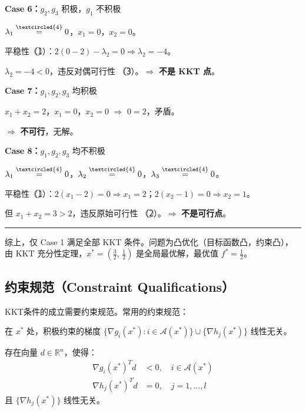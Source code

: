 \begin{example}[KKT条件求解]
\bigskip\noindent\textbf{Case 6：}$g_2,g_3$ 积极，$g_1$ 不积极

$\lambda_1 \stackrel{\textcircled{4}}{=} 0$，$x_1 = 0$，$x_2 = 0$。

平稳性（\textcircled{1}）：$2(0-2) - \lambda_2 = 0 \Rightarrow \lambda_2 = -4$。

$\lambda_2 = -4 < 0$，违反对偶可行性 （\textcircled{3}）。$\Rightarrow$ \textbf{不是 KKT 点}。

\bigskip\noindent\textbf{Case 7：}$g_1,g_2,g_3$ 均积极

$x_1 + x_2 = 2$，$x_1 = 0$，$x_2 = 0$ $\Rightarrow$ $0 = 2$，矛盾。

$\Rightarrow$ \textbf{不可行}，无解。

\bigskip\noindent\textbf{Case 8：}$g_1,g_2,g_3$ 均不积极

$\lambda_1 \stackrel{\textcircled{4}}{=} 0$，$\lambda_2 \stackrel{\textcircled{4}}{=} 0$，$\lambda_3 \stackrel{\textcircled{4}}{=} 0$。

平稳性（\textcircled{1}）：$2(x_1-2) = 0 \Rightarrow x_1 = 2$；$2(x_2-1) = 0 \Rightarrow x_2 = 1$。

但 $x_1 + x_2 = 3 > 2$，违反原始可行性 （\textcircled{2}）。$\Rightarrow$ \textbf{不是可行点}。

\medskip\noindent\rule{\textwidth}{0.4pt}

综上，仅 Case 1 满足全部 KKT 条件。问题为凸优化（目标函数凸，约束凸），由 KKT 充分性定理，$x^* = \left(\frac{3}{2},\,\frac{1}{2}\right)$ 是全局最优解，最优值 $f^* = \frac{1}{2}$。
\end{example}

\subsection{约束规范（Constraint Qualifications）}\label{sec:cq}

KKT条件的成立需要约束规范。常用的约束规范：

\begin{definition}
在 $x^*$ 处，积极约束的梯度 $\{\nabla g_i(x^*) : i \in \mathcal{A}(x^*)\} \cup \{\nabla h_j(x^*)\}$ 线性无关。
\end{definition}

\begin{definition}
存在向量 $d \in \mathbb{R}^n$，使得：
\begin{align*}
\nabla g_i(x^*)^T d &< 0, \quad i \in \mathcal{A}(x^*) \\
\nabla h_j(x^*)^T d &= 0, \quad j = 1, \ldots, l
\end{align*}
且 $\{\nabla h_j(x^*)\}$ 线性无关。
\end{definition}

